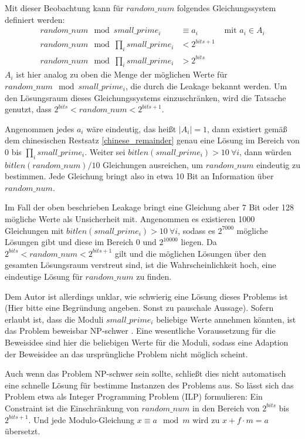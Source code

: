 Mit dieser Beobachtung kann für $random\_num$ folgendes Gleichungssystem definiert werden:
\begin{align*}
    random\_num \mod small\_prime_i &\equiv a_i &\text{ mit } a_i \in A_i\\
    random\_num \mod \prod_i small\_prime_i &< 2^{bits+1} \\
    random\_num \mod \prod_i small\_prime_i &> 2^{bits}
\end{align*}
$A_i$ ist hier analog zu oben die Menge der möglichen Werte für $random\_num \mod small\_prime_i$, die durch die Leakage bekannt werden.
Um den Lösungsraum dieses Gleichungssystems einzuschränken, wird die Tatsache genutzt, dass $2^{bits} < random\_num < 2^{bits+1}$.

Angenommen jedes $a_i$ wäre eindeutig, das heißt $|A_i|=1$, dann existiert gemäß dem chinesischen Restsatz \ref{chinese_remainder} genau eine Lösung im Bereich von $0$ bis $\prod_i small\_prime_i$.
Weiter sei $bitlen(small\_prime_i) > 10 \: \forall i$, dann würden $bitlen(random\_num)/10$ Gleichungen ausreichen, um $random\_num$ eindeutig zu bestimmen.
Jede Gleichung bringt also in etwa 10 Bit an Information über $random\_num$.

Im Fall der oben beschrieben Leakage bringt eine Gleichung aber 7 Bit oder 128 mögliche Werte als Unsicherheit mit.
Angenommen es existieren 1000 Gleichungen mit $bitlen(small\_prime_i) > 10 \: \forall i$, sodass es $2^{7000}$ mögliche Lösungen gibt und diese im Bereich 0 und $2^{10000}$ liegen.
Da $2^{bits} < random\_num < 2^{bits+1}$ gilt und die möglichen Lösungen über den gesamten Lösungsraum verstreut sind, ist die Wahrscheinlichkeit hoch, eine eindeutige Lösung für $random\_num$ zu finden.

Dem Autor ist allerdings unklar, wie schwierig eine Lösung dieses Problems ist (Hier bitte eine Begründung angeben. Sonst zu pauschale Aussage).
Sofern erlaubt ist, dass die Moduli $small\_prime_i$ beliebige Werte annehmen könnten, ist das Problem beweisbar NP-schwer \cite{FuzzyCRTProof}.
Eine wesentliche Voraussetzung für die Beweisidee sind hier die beliebigen Werte für die Moduli, sodass eine Adaption der Beweisidee an das ursprüngliche Problem nicht möglich scheint. 

Auch wenn das Problem NP-schwer sein sollte, schließt dies nicht automatisch eine schnelle Lösung für bestimme Instanzen des Problems aus.
So lässt sich das Problem etwa als Integer Programming Problem (ILP) formulieren:
Ein Constraint ist die Einschränkung von $random\_num$ in den Bereich von $2^{bits}$ bis $2^{bits+1}$.
Und jede Modulo-Gleichung $x \equiv a \mod m$ wird zu $x + f \cdot m = a$ übersetzt.

